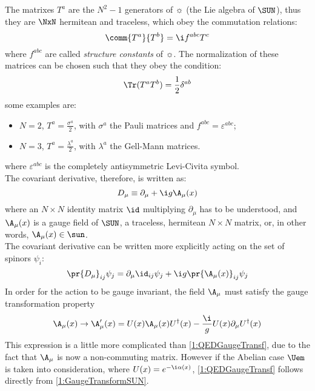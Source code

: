 The matrixes $T^a$ are the $N^2-1$ generators of $\sun$ (the Lie algebra of $\SUN$), thus they are $\NxN$ hermitean and traceless, which obey the commutation relations:
\begin{equation}
    \comm{T^a}{T^b} = \i f^{abc}T^c \label{1:StrConstSUN}
\end{equation}
where $f^{abc}$ are called \emph{structure constants} of $\sun$. The normalization of these matrices can be chosen such that they obey the condition:
\begin{equation}
    \Tr(T^aT^b) = \frac12\delta^{ab} \label{1:NormCondSUN}
\end{equation}
some examples are:
\begin{itemize}
    \item $N=2$, $T^a=\frac{\sigma^a}{2}$, with $\sigma^a$ the Pauli matrices and $f^{abc}=\varepsilon^{abc}$;
    \item $N=3$, $T^a=\frac{\lambda^a}{2}$, with $\lambda^a$ the Gell-Mann matrices.
\end{itemize}
where $\varepsilon^{abc}$ is the completely antisymmetric Levi-Civita symbol.\\
The covariant derivative, therefore, is written as:
\begin{equation}
    D_\mu \equiv \partial_\mu + \i g \A_\mu(x) \label{1:CovDeriv}
\end{equation}
where an $N\times N$ identity matrix $\id$ multiplying $\partial_\mu$ has to be understood, and $\A_\mu(x)$ is a gauge field of $\SUN$, \ie a traceless, hermitean $N\times N$ matrix, or, in other words, $\A_\mu(x)\in\sun$.\\
The covariant derivative can be written more explicitly acting on the set of spinors $\psi_i$:
\begin{equation*}
    \pr{D_\mu}_{ij}\psi_j = \partial_\mu \id_{ij}\psi_j + \i g \pr{\A_\mu(x)}_{ij}\psi_j
\end{equation*}
In order for the action to be gauge invariant, the field $\A_\mu$ must satisfy the gauge transformation property
\begin{equation}
    \A_\mu(x) \rightarrow \A_\mu'(x) = U(x)\A_\mu(x)U^\dagger(x) - \frac{\i}{g}U(x)\partial_\mu U^\dagger(x) \label{1:GaugeTransformSUN}
\end{equation}
This expression is a little more complicated than \eqref{1:QEDGaugeTransf}, due to the fact that $\A_\mu$ is now a non-commuting matrix. However if the Abelian case $\Uem$ is taken into consideration, where $U(x)=e^{-\i\alpha(x)}$, \eqref{1:QEDGaugeTransf} follows directly from \eqref{1:GaugeTransformSUN}.\\
